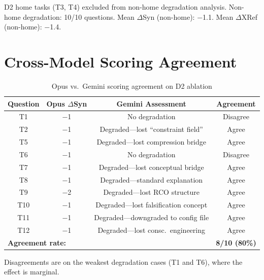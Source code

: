 \documentclass[12pt,letterpaper]{article}
\begin{document}
\noindent *D2 home tasks (T3, T4) excluded from non-home degradation analysis. Non-home degradation: 10/10 questions. Mean $\Delta$Syn (non-home): $-$1.1. Mean $\Delta$XRef (non-home): $-$1.4.

\section{Cross-Model Scoring Agreement}
\label{app:cross-model}

\begin{table}[H]
\centering
\caption{Opus vs.\ Gemini scoring agreement on D2 ablation}
\label{tab:scoring-agreement}
\begin{tabular}{cccc}
\toprule
\textbf{Question} & \textbf{Opus $\Delta$Syn} & \textbf{Gemini Assessment} & \textbf{Agreement} \\
\midrule
T1 & $-$1 & No degradation & Disagree \\
T2 & $-$1 & Degraded---lost ``constraint field'' & Agree \\
T5 & $-$1 & Degraded---lost compression bridge & Agree \\
T6 & $-$1 & No degradation & Disagree \\
T7 & $-$1 & Degraded---lost conceptual bridge & Agree \\
T8 & $-$1 & Degraded---standard explanation & Agree \\
T9 & $-$2 & Degraded---lost RCO structure & Agree \\
T10 & $-$1 & Degraded---lost falsification concept & Agree \\
T11 & $-$1 & Degraded---downgraded to config file & Agree \\
T12 & $-$1 & Degraded---lost consc.\ engineering & Agree \\
\midrule
\multicolumn{3}{l}{\textbf{Agreement rate:}} & \textbf{8/10 (80\%)} \\
\bottomrule
\end{tabular}
\end{table}

\noindent Disagreements are on the weakest degradation cases (T1 and T6), where the effect is marginal.



\end{document}

